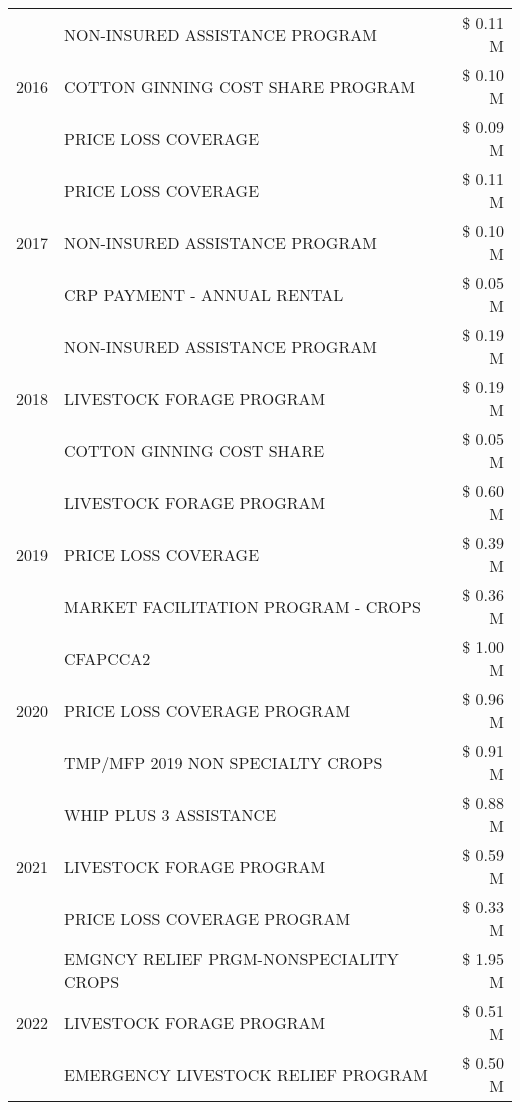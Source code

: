 \begin{tabular}{llr}
\cline{1-3}
\multirow[t]{3}{*}{2016} & NON-INSURED ASSISTANCE PROGRAM & \$ 0.11 M \\
 & COTTON GINNING COST SHARE PROGRAM & \$ 0.10 M \\
 & PRICE LOSS COVERAGE & \$ 0.09 M \\
\cline{1-3}
\multirow[t]{3}{*}{2017} & PRICE LOSS COVERAGE & \$ 0.11 M \\
 & NON-INSURED ASSISTANCE PROGRAM & \$ 0.10 M \\
 & CRP PAYMENT - ANNUAL RENTAL & \$ 0.05 M \\
\cline{1-3}
\multirow[t]{3}{*}{2018} & NON-INSURED ASSISTANCE PROGRAM & \$ 0.19 M \\
 & LIVESTOCK FORAGE PROGRAM & \$ 0.19 M \\
 & COTTON GINNING COST SHARE & \$ 0.05 M \\
\cline{1-3}
\multirow[t]{3}{*}{2019} & LIVESTOCK FORAGE PROGRAM & \$ 0.60 M \\
 & PRICE LOSS COVERAGE & \$ 0.39 M \\
 & MARKET FACILITATION PROGRAM - CROPS & \$ 0.36 M \\
\cline{1-3}
\multirow[t]{3}{*}{2020} & CFAPCCA2 & \$ 1.00 M \\
 & PRICE LOSS COVERAGE PROGRAM & \$ 0.96 M \\
 & TMP/MFP 2019 NON SPECIALTY CROPS & \$ 0.91 M \\
\cline{1-3}
\multirow[t]{3}{*}{2021} & WHIP PLUS 3 ASSISTANCE & \$ 0.88 M \\
 & LIVESTOCK FORAGE PROGRAM & \$ 0.59 M \\
 & PRICE LOSS COVERAGE PROGRAM & \$ 0.33 M \\
\cline{1-3}
\multirow[t]{3}{*}{2022} & EMGNCY RELIEF PRGM-NONSPECIALITY CROPS & \$ 1.95 M \\
 & LIVESTOCK FORAGE PROGRAM & \$ 0.51 M \\
 & EMERGENCY LIVESTOCK RELIEF PROGRAM & \$ 0.50 M \\
\cline{1-3}
\bottomrule
\end{tabular}
